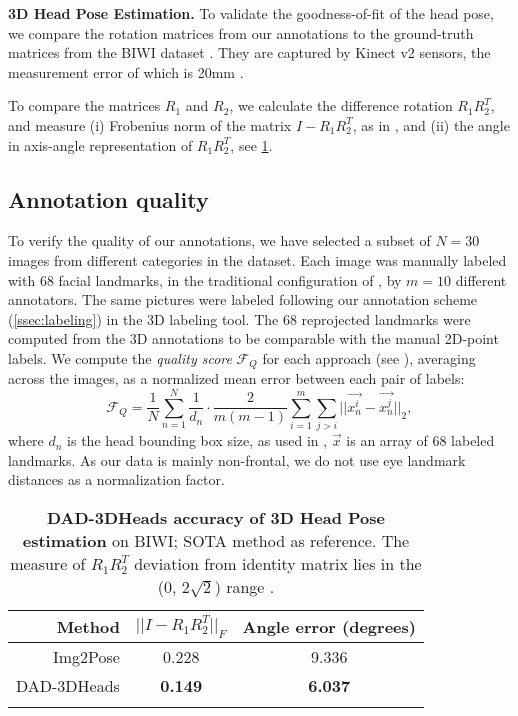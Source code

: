 \documentclass[10pt,twocolumn,letterpaper]{article}
\begin{document}
\textbf{3D Head Pose Estimation.} To validate the  goodness-of-fit of the head pose, we compare the rotation matrices from our annotations to the ground-truth matrices from the BIWI dataset \cite{BIWI}. They are captured by Kinect v2 sensors, the measurement error of which is 20mm \cite{Kinect_v2}.

To compare the matrices $R_1$ and $R_2$, we calculate the difference rotation $R_1 R_2^T$, and measure (i) Frobenius norm of the matrix $I - R_1 R_2^{T}$, as in \cite{rot_matrix_metrics}, and (ii) the angle in axis-angle representation of $R_1 R_2^T$, see \cref{t:3dpose_GT}.

\subsection{Annotation quality}\label{ssec:consistency}


To verify the quality of our annotations, we have selected a subset of $N=30$ images from different categories in the dataset. 
Each image was manually labeled with 68 facial landmarks, 
in the traditional configuration of \cite{multipie}, by $m=10$ different annotators. 
The same pictures were labeled following our annotation scheme (\cref{ssec:labeling}) in the 3D labeling tool. 
The 68 reprojected landmarks were computed from the 3D annotations to be comparable with the manual 2D-point labels. 
We compute the \textit{quality score} $\mathcal{F}_Q$ for each approach (see ), averaging across the images, as a normalized mean error between each pair of labels:
\begin{equation} \label{eq:422}
    \mathcal{F}_{Q} = \frac{1}{N} \sum_{n=1}^{N} \frac{1}{d_n} \cdot \frac{2}{m(m-1)} \sum_{i=1}^m \sum_{j>i} \Big|\Big|\overrightarrow{x_n^i} - \overrightarrow{x_n^j}\Big|\Big|_2,
\end{equation} 
where $d_n$ is the head bounding box size, as used in \cite{NME_bbox1, NME_bbox2}, $\overrightarrow{x}$ is an array of 68 labeled landmarks. 
As our data is mainly non-frontal, we do not use eye landmark distances as a normalization factor.
\begin{table}[t]
\footnotesize
\renewcommand{\arraystretch}{0.95}
\centering
\begin{tabular}{r|c|c}
\noalign{\smallskip}
Method & $||I-R_1 R_2^{T}||_F$ & Angle error (degrees)\\
\hline
Img2Pose \cite{img2pose} & 0.228 & 9.336  \\
DAD-3DHeads & \textbf{0.149} & \textbf{6.037} \\ \noalign{\smallskip}
\end{tabular}
\caption{\textbf{DAD-3DHeads accuracy of 3D Head Pose estimation} on BIWI\cite{BIWI}; SOTA method as reference. The measure of $R_1 R_2^{T}$ deviation from identity matrix lies in the (0, $2\sqrt{2}$) range \cite{rot_matrix_metrics}.}
\label{t:3dpose_GT}
\end{table}
 
\end{document}
